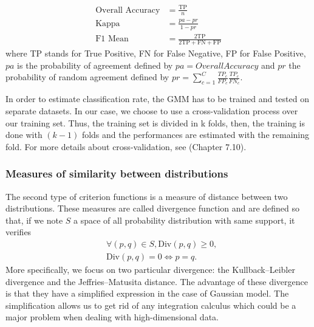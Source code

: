 \documentclass[a4paper,11pt,DIV=16,abstracton]{scrartcl}
\begin{document}
        \begin{align}
            \text{Overall Accuracy} &= \frac{\text{TP}}{n} \\
            \text{Kappa} &= \frac{pa - pr}{1 - pr}  \\
            \text{F1 Mean} &= \frac{2 \text{TP}}{2 \text{TP} + \text{FN} + \text{FP}}
        \end{align}
        where TP stands for True Positive, FN for False Negative, FP for False Positive, $pa$ is the probability of agreement defined by $pa = Overall Accuracy$  and $pr$ the probability of random agreement defined by $pr = \sum_{c=1}^{C} \frac{TP_c}{FP_c} \frac{TP_c}{FN_c}$.

        In order to estimate classification rate, the GMM has to be trained and tested on separate datasets. In our case, we choose to use a cross-validation process over our training set. Thus, the training set is divided in k folds, then, the training is done with $(k-1)$ folds and the performances are estimated with the remaining fold. For more details about cross-validation, see \cite{opac-b1127878} (Chapter 7.10).

        \subsubsection{Measures of similarity between distributions}

        The second type of criterion functions is a measure of distance between two distributions. These measures are called divergence function and are defined so that, if we note $S$ a space of all probability distribution with same support, it verifies
        \begin{align*}
            &\forall (p,q) \in S, \text{Div}(p,q) \geq 0, \\
            &\text{Div}(p,q) = 0 \Leftrightarrow p = q.
        \end{align*}
        More specifically, we focus on two particular divergence: the Kullback–Leibler divergence and the Jeffries–Matusita distance. The advantage of these divergence is that they have a simplified expression in the case of Gaussian model. The simplification allows us to get rid of any integration calculus which could be a major problem when dealing with high-dimensional data.
\end{document}

